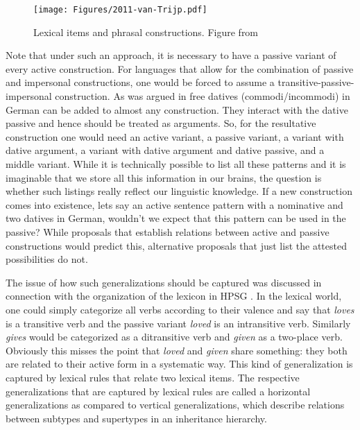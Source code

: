 \begin{figure}
\texttt{[image: Figures/2011-van-Trijp.pdf]}
\caption{\label{fig-as-trijp}Lexical items and phrasal constructions. Figure %
from }
\end{figure}%

Note that under such an approach, it is necessary to have a passive variant of every active
construction. For languages that allow for the combination of passive and impersonal constructions,
one would be forced to assume a transitive-passive-impersonal construction. As was argued in
 free datives (commodi/incommodi) in German can be added to almost
any construction. They interact with the dative passive and hence should be treated as
arguments. So, for the resultative construction one would need an active variant, a passive variant,
a variant with dative argument, a variant with dative argument and dative passive, and a middle variant.
While it is technically possible to list all these patterns and it is imaginable that we store all
this information in our brains, the question is whether such listings really reflect our linguistic
knowledge. If a new construction comes into existence, lets say an active sentence pattern with a
nominative and two datives in German, wouldn't we expect that this pattern can be used in the
passive? While proposals that establish relations between active and passive constructions would
predict this, alternative proposals that just list the attested possibilities do not.

\addlines[2]
The issue of how such generalizations should be captured was discussed in connection with the
organization of the lexicon in HPSG \citep{Flickinger87,Meurers2001a}. In the lexical world, one could simply categorize all verbs according to their
valence and say that \emph{loves} is a transitive verb and the passive variant \emph{loved} is an
intransitive verb. Similarly \emph{gives} would be categorized as a ditransitive verb and
\emph{given} as a two-place verb. Obviously this misses the point that \emph{loved} and \emph{given}
share something: they both are related to their active form in a systematic way. This kind of
generalization is captured by lexical rules that relate two lexical items. The respective
generalizations that are captured by lexical rules are called a horizontal generalizations as compared to vertical generalizations, which
describe relations between subtypes and supertypes in an inheritance hierarchy.


